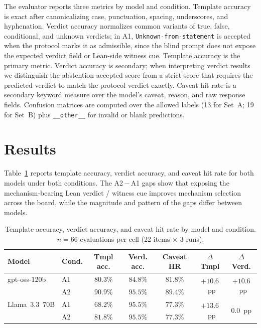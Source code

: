\documentclass[11pt]{article}
\begin{document}
The evaluator reports three metrics by model and condition. Template
accuracy is exact after canonicalizing case, punctuation, spacing,
underscores, and hyphenation. Verdict accuracy normalizes common variants
of true, false, conditional, and unknown verdicts; in A1,
\texttt{Unknown{-}from{-}statement} is accepted when the protocol marks it
as admissible, since the blind prompt does not expose the expected verdict
field or Lean-side witness cue.
Template accuracy is the primary metric. Verdict accuracy is secondary; when
interpreting verdict results we distinguish the abstention-accepted score from
a strict score that requires the predicted verdict to match the protocol
verdict exactly.
Caveat hit rate is a secondary keyword measure over the model's caveat,
reason, and raw response fields. Confusion matrices are computed over the
allowed labels (13 for Set~A; 19 for Set~B) plus \texttt{\_\_other\_\_} for invalid or blank
predictions.

\section{Results}
\label{sec:results}

Table~\ref{tab:template} reports template accuracy, verdict accuracy, and
caveat hit rate for both models under both conditions.
The A2\,$-$\,A1 gaps show that exposing the mechanism-bearing Lean verdict /
witness cue
improves mechanism selection across the board,
while the magnitude and pattern of the gaps differ between models.

\begin{table}[htbp]
\centering
\caption{Template accuracy, verdict accuracy, and caveat hit rate by model
         and condition. $n = 66$ evaluations per cell (22 items $\times$ 3 runs).}
\label{tab:template}
\begin{tabular}{llccccc}
\toprule
\textbf{Model} & \textbf{Cond.}
  & \textbf{Tmpl acc.} & \textbf{Verd. acc.} & \textbf{Caveat HR}
  & \textbf{$\Delta$ Tmpl} & \textbf{$\Delta$ Verd.} \\
\midrule
gpt-oss-120b  & A1 & $80.3\%$ & $84.8\%$ & $81.8\%$ & \multirow{2}{*}{$+10.6$~pp} & \multirow{2}{*}{$+10.6$~pp} \\
              & A2 & $90.9\%$ & $95.5\%$ & $89.4\%$ & & \\
\midrule
Llama~3.3~70B & A1 & $68.2\%$ & $95.5\%$ & $77.3\%$ & \multirow{2}{*}{$+13.6$~pp} & \multirow{2}{*}{$0.0$~pp} \\
              & A2 & $81.8\%$ & $95.5\%$ & $77.3\%$ & & \\
\bottomrule
\end{tabular}
\end{table}
\end{document}
